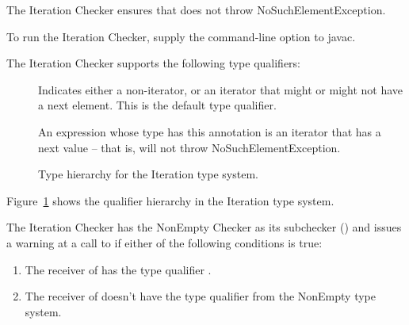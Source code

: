 \htmlhr
{}

The Iteration Checker ensures that  does not throw NoSuchElementException.

To run the Iteration Checker, supply the
command-line option to javac.

The Iteration Checker supports the following type qualifiers:
\begin{description}

    \item[]
    Indicates either a non-iterator, or an iterator that might or might not have a next element.
    This is the default type qualifier.

    \item[]
    An expression whose type has this annotation is an iterator that has a next value -- that is,
     will not throw NoSuchElementException.

\end{description}

\begin{figure}
    \caption{Type hierarchy for the Iteration type system.}
    \label{fig-iteration-hierarchy}
\end{figure}

Figure~\ref{fig-iteration-hierarchy} shows the qualifier hierarchy in the Iteration type system.


The Iteration Checker has the NonEmpty Checker as its subchecker ()
and issues a warning at a call to  if either of the
following conditions is true:

\begin{enumerate}
    \item The receiver of  has the type qualifier .
    \item The receiver of  doesn't have the type qualifier 
    from the NonEmpty type system.
\end{enumerate}


